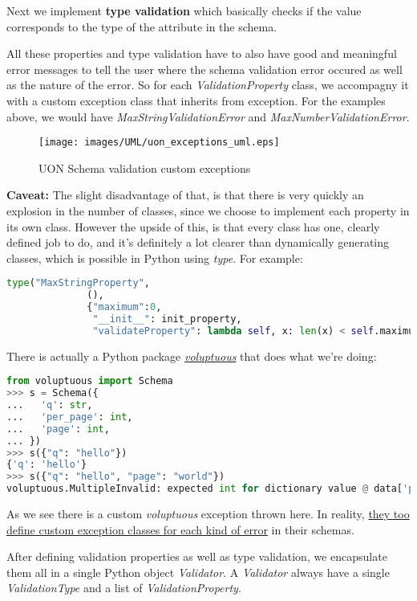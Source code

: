 \documentclass[12pt]{article}
\begin{document}
Next we implement \textbf{type validation} which basically checks if the value corresponds to the type of the attribute in the schema.

All these properties and type validation have to also have good and meaningful error messages to tell the user where the schema validation error occured as well as the nature of the error. So for each \emph{ValidationProperty} class, we accompagny it with a custom exception class that inherits from exception. For the examples above, we would have \emph{MaxStringValidationError} and \emph{MaxNumberValidationError}.

\begin{figure}[ht!]
 	\centering
 	\caption{UON Schema validation custom exceptions}
 	\texttt{[image: images/UML/uon\_exceptions\_uml.eps]}
 	\label{fig:uon_exceptions}
\end{figure}

\pagebreak

\textbf{Caveat:} The slight disadvantage of that, is that there is very quickly an explosion in the number of classes, since we choose to implement each property in its own class. However the upside of this, is that every class has one, clearly defined job to do, and it's definitely a lot clearer than dynamically generating classes, which is possible in Python using \emph{type}. For example:
\begin{lstlisting}[language=Python]
type("MaxStringProperty", 
              (), 
              {"maximum":0, 
               "__init__": init_property,
               "validateProperty": lambda self, x: len(x) < self.maximum})
\end{lstlisting}
There is actually a Python package  \href{https://github.com/alecthomas/voluptuous}{\emph{voluptuous}} that does what we're doing:
\begin{lstlisting}[language=Python]
from voluptuous import Schema
>>> s = Schema({
...   'q': str,
...   'per_page': int,
...   'page': int,
... })
>>> s({"q": "hello"})
{'q': 'hello'}
>>> s({"q": "hello", "page": "world"})
voluptuous.MultipleInvalid: expected int for dictionary value @ data['page']
\end{lstlisting}
As we see there is a custom \emph{voluptuous} exception thrown here. In reality, \href{https://github.com/alecthomas/voluptuous/blob/master/voluptuous/error.py}{they too define custom exception classes for each kind of error} in their schemas. 

After defining validation properties as well as type validation, we encapsulate them all in a single Python object \emph{Validator}. A \emph{Validator} always have a single \emph{ValidationType} and a list of \emph{ValidationProperty}.
\end{document}
